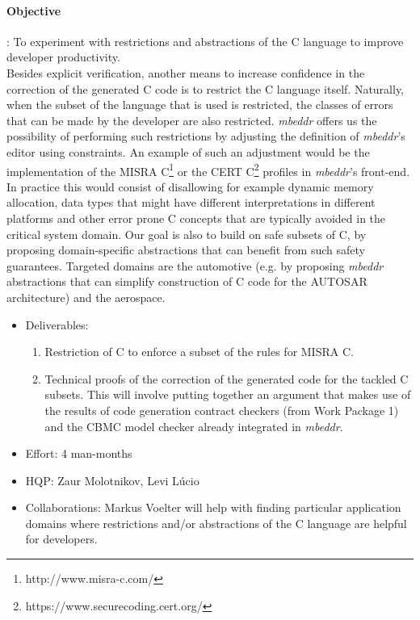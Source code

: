 \paragraph{\textbf{Objective}}: To experiment with restrictions
and abstractions of the C language to improve developer
productivity.\vspace{.2cm}\\
Besides explicit verification, another means to increase confidence in the
correction of the generated C code is to restrict the C language itself.
Naturally, when the subset of the language that is used is restricted, the
classes of errors that can be made by the developer are also restricted. \emph{mbeddr}
offers us the possibility of performing such restrictions by adjusting the
definition of \emph{mbeddr}'s editor using constraints. An example of such an
adjustment would be the implementation of the MISRA C\footnote{http://www.misra-c.com/} or the CERT
C\footnote{https://www.securecoding.cert.org/} profiles in \emph{mbeddr}’s front-end.
In practice this would consist of disallowing for example dynamic memory
allocation, data types that might have different interpretations in different
platforms and other error prone C concepts that are typically avoided in the
critical system domain.
Our goal is also to build on safe subsets of C, by proposing domain-specific
abstractions that can benefit from such safety guarantees. Targeted domains are
the automotive (e.g. by proposing \emph{mbeddr} abstractions that can simplify
construction of C code for the AUTOSAR architecture) and the
aerospace.

\begin{itemize}
  \item Deliverables:
  \begin{enumerate}
    \item Restriction of C to enforce a subset of the rules for MISRA C.
\item Technical proofs of the correction of the generated code for the tackled C
subsets. This will involve putting together an argument that makes use of the
results of code generation contract checkers (from Work Package 1) and the CBMC
model checker already integrated in \emph{mbeddr}.
  \end{enumerate}
  \item Effort: 4 man-months
  \item HQP: Zaur Molotnikov, Levi L\'ucio
  \item Collaborations: Markus Voelter will help with finding
  particular application domains where restrictions and/or abstractions of the C
  language are helpful for developers.
\end{itemize}